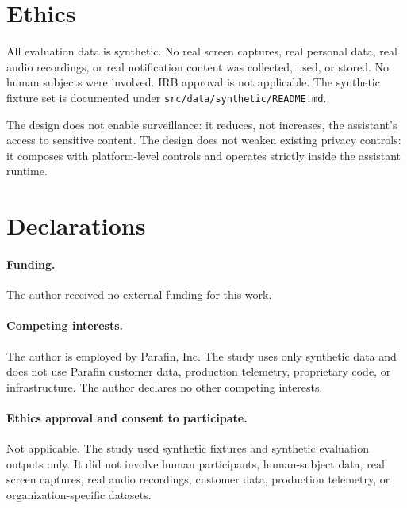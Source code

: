 \documentclass[sn-mathphys-num]{sn-jnl}
\begin{document}
\section{Ethics}\label{sec:ethics}

All evaluation data is synthetic. No real screen captures, real personal data,
real audio recordings, or real notification content was collected, used, or
stored. No human subjects were involved. IRB approval is not applicable. The
synthetic fixture set is documented under \texttt{src/data/synthetic/README.md}.

The design does not enable surveillance: it reduces, not increases, the
assistant's access to sensitive content. The design does not weaken existing
privacy controls: it composes with platform-level controls and operates
strictly inside the assistant runtime.

\section*{Declarations}

\paragraph{Funding.}
The author received no external funding for this work.

\paragraph{Competing interests.}
The author is employed by Parafin, Inc. The study uses only synthetic data and
does not use Parafin customer data, production telemetry, proprietary code, or
infrastructure. The author declares no other competing interests.

\paragraph{Ethics approval and consent to participate.}
Not applicable. The study used synthetic fixtures and synthetic evaluation
outputs only. It did not involve human participants, human-subject data, real
screen captures, real audio recordings, customer data, production telemetry, or
organization-specific datasets.
\end{document}

